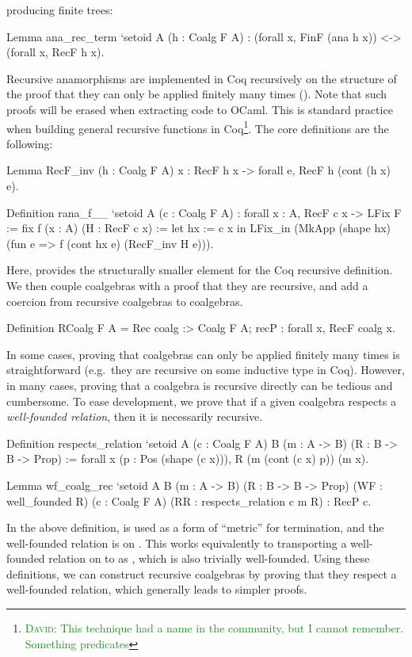 \documentclass[anonymous, a4paper, UKenglish, cleveref, autoref, thm-restate]{lipics-v2021}
\newcommand{\dcas}[1]{\textcolor{ForestGreen}{\textsc{David}: #1}}
\begin{document}
producing finite trees:
\begin{coqcode}
Lemma ana_rec_term `{setoid A} (h : Coalg F A)
  : (forall x, FinF (ana h x)) <-> (forall x, RecF h x).
\end{coqcode}
Recursive anamorphisms are implemented in Coq recursively on the structure of
the proof that they can only be applied finitely many times
().  Note that such proofs will be erased when extracting
code to OCaml. This is standard practice when building general recursive
functions in Coq\footnote{\dcas{This technique had a name in the community, but
I cannot remember. Something predicates}}. The core definitions are the
following:
\begin{coqcode}
Lemma RecF_inv (h : Coalg F A) x : RecF h x -> forall e, RecF h (cont (h x) e).

Definition rana_f__ `{setoid A} (c : Coalg F A)
  : forall x : A, RecF c x -> LFix F
  := fix f (x : A) (H : RecF c x) :=
       let hx := c x in
       LFix_in (MkApp (shape hx) (fun e => f (cont hx e) (RecF_inv H e))).
\end{coqcode}
Here,  provides the structurally smaller element for
the Coq recursive definition. We then couple coalgebras with a proof that they
are recursive, and add a coercion from recursive coalgebras to coalgebras.
\begin{coqcode}
Definition RCoalg F A = Rec {coalg :> Coalg F A; recP : forall x, RecF coalg x}.
\end{coqcode}
In some cases, proving that coalgebras can only be applied finitely many
times is straightforward (e.g.\ they are recursive on some inductive type in
Coq). However, in many cases, proving that a coalgebra is recursive directly
can be tedious and cumbersome. To ease development, we prove that if a 
given coalgebra respects a \emph{well-founded relation}, then it is 
necessarily recursive.
\begin{coqcode}
Definition respects_relation `{setoid A} (c : Coalg F A)
      {B} (m : A -> B) (R : B -> B -> Prop)
  := forall x (p : Pos (shape (c x))), R (m (cont (c x) p)) (m x).

Lemma wf_coalg_rec `{setoid A} {B}
  (m : A -> B) (R : B -> B -> Prop) (WF : well_founded R)
  (c : Coalg F A) (RR : respects_relation c m R) : RecP c.
\end{coqcode}
In the above definition,  is used as a form of ``metric''
for termination, and the well-founded relation is on . This
works equivalently to transporting a well-founded relation 
on
 to  as 
, which is also trivially
well-founded. Using these definitions, we can construct recursive coalgebras by
proving that they respect a well-founded relation, which generally leads to
simpler proofs.
\end{document}
